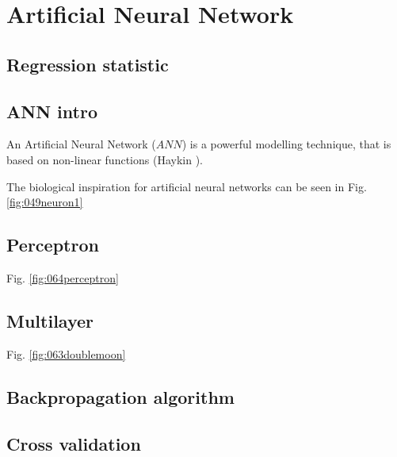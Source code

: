 
\chapter{Artificial Neural Network}
\label{cap:ann}

\section{Regression statistic}
\label{sec:regressionstatistic}

\section{ANN intro}
\label{sec:annintro}

An Artificial Neural Network ($ANN$) is a powerful modelling technique, 
that is based on non-linear functions (Haykin \cite{RefWorks:158}). 


The biological inspiration for artificial neural networks can be seen in Fig.
\ref{fig:049neuron1}



\section{Perceptron}
\label{sec:perceptron}

Fig. \ref{fig:064perceptron}\\


\section{Multilayer}
\label{sec:multilayer}

Fig. \ref{fig:063doublemoon}\\


\section{Backpropagation algorithm}
\label{sec:backpropagationalgorithm}

\section{Cross validation}
\label{sec:crossvalidation}

